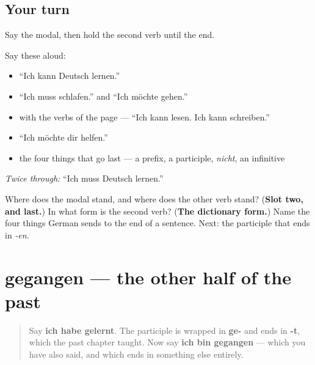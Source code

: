 \subsection*{Your turn}
Say the modal, then hold the second verb until the end.

Say these aloud:

\begin{itemize}
\raggedright
  \item \textquotedblleft{}Ich kann Deutsch lernen.\textquotedblright{}
  \item \textquotedblleft{}Ich muss schlafen.\textquotedblright{} and \textquotedblleft{}Ich möchte gehen.\textquotedblright{}
  \item with the verbs of the page — \textquotedblleft{}Ich kann lesen. Ich kann schreiben.\textquotedblright{}
  \item \textquotedblleft{}Ich möchte dir helfen.\textquotedblright{}
  \item the four things that go last — a prefix, a participle, \emph{nicht}, an infinitive
\end{itemize}

\emph{Twice through:} \textquotedblleft{}Ich muss Deutsch lernen.\textquotedblright{}

\begin{tcolorbox}[breakable,colback=teal!4,colframe=teal!35!black,title={Before you move on}]
Where does the modal stand, and where does the other verb stand? (\textbf{Slot two, and last.}) In what form is the second verb? (\textbf{The dictionary form.}) Name the four things German sends to the end of a sentence. Next: the participle that ends in \emph{-en}.
\end{tcolorbox}
\section[gegangen]{gegangen — the other half of the past}

\label{lesson:GE-C38-partizip-en}



\begin{quote}
Say \textbf{ich habe gelernt}. The participle is wrapped in \textbf{ge-} and ends in \textbf{-t}, which the past chapter taught. Now say \textbf{ich bin gegangen} — which you have also said, and which ends in something else entirely.
\end{quote}

